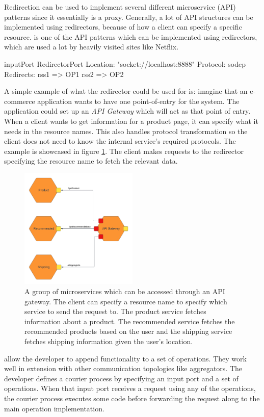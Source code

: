 Redirection can be used to implement several different microservice (API) patterns since it essentially is a proxy.
Generally, a lot of API structures can be implemented using redirectors, because of how a client can specify a specific resource.
 is one of the API patterns which can be implemented using redirectors, which are used a lot by heavily visited sites like Netflix.

\begin{jolisting}[][caption={Input port which redirects requests using resource names}, label=lst:redirector-inputport]
inputPort RedirectorPort {
    Location: "socket://localhost:8888"
    Protocol: sodep
    Redirects:
        rss1 => OP1
        rss2 => OP2
}
\end{jolisting}

A simple example of what the redirector could be used for is: imagine that an e-commerce application wants to have one point-of-entry for the system. The application could set up an \textit{API Gateway} which will act as that point of entry. 
When a client wants to get information for a product page, it can specify what it needs in the resource names. This also handles protocol transformation so the client does not need to know the internal service's required protocols.
The example is showcased in figure \ref*{figure:redirector_example}. The client makes requests to the redirector specifying the resource name to fetch the relevant data.
\begin{figure}[h!]
    \center
    \includegraphics[width=0.5\textwidth]{figures/redirector_example.png}
    \caption{A group of microservices which can be accessed through an API gateway. 
    The client can specify a resource name to specify which service to send the request to.
    The product service fetches information about a product. The recommended service fetches
    the recommended products based on the user and the shipping service fetches shipping information given the user's location.}
    \label{figure:redirector_example}
\end{figure}
  allow the developer to append functionality to a set of operations. They work well in extension with other communication topologies like aggregators.
The developer defines a courier process by specifying an input port and a set of operations. When that input port receives a request using any of the operations, the courier process executes some code before forwarding
the request along to the main operation implementation.

